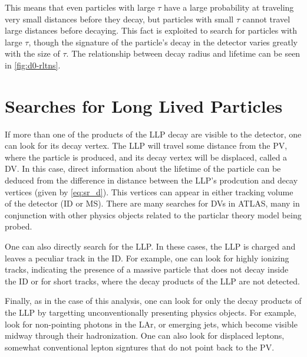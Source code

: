 This means that even particles with large $\tau$ have a large probability at traveling very small distances before they decay, but particles with small $\tau$ cannot travel large distances before decaying. This fact is exploited to search for particles with large $\tau$, though the signature of the particle's decay in the detector varies greatly with the size of $\tau$. The relationship between decay radius and lifetime can be seen in \autoref{fig:d0-rltns}.


\section{\label{sec:llp-searches}Searches for Long Lived Particles}



If more than one of the products of the \ac{LLP} decay are visible to the detector, one can look for its decay vertex. The \ac{LLP} will travel some distance from the \ac{PV}, where the particle is produced, and its decay vertex will be displaced, called a \ac{DV}. In this case, direct information about the lifetime of the particle can be deduced from the difference in distance between the \ac{LLP}'s prodcution and decay vertices (given by \autoref{eq:sr_d}). This vertices can appear in either tracking volume of the detector (\ac{ID} or \ac{MS}). There are many searches for \ac{DV}s in \ac{ATLAS}, many in conjunction with other physics objects related to the particlar theory model being probed. 

One can also directly search for the \ac{LLP}. In these cases, the \ac{LLP} is charged and leaves a peculiar track in the \ac{ID}. For example, one can look for highly ionizing tracks, indicating the presence of a massive particle that does not decay inside the \ac{ID} or for short tracks, where the decay products of the \ac{LLP} are not detected.

Finally, as in the case of this analysis, one can look for only the decay products of the \ac{LLP} by targetting  unconventionally presenting physics objects. For example, look for non-pointing photons in the \ac{LAr}, or emerging jets, which become visible midway through their hadronization. One can also look for displaced leptons, somewhat conventional lepton signtures that do not point back to the \ac{PV}. 

